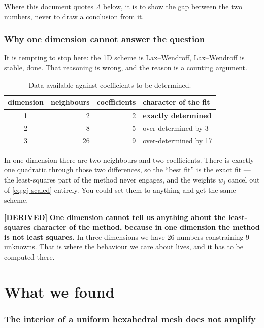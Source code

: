 \documentclass[11pt,a4paper]{article}
\newcommand{\derived}{\textcolor{blue!50!black}{\textbf{[DERIVED]}}}
\begin{document}
Where this document quotes $\Lambda$ below, it is to show the gap between the two numbers, never
to draw a conclusion from it.

\section{Why one dimension cannot answer the question}

It is tempting to stop here: the 1D scheme is Lax--Wendroff, Lax--Wendroff is stable, done.
That reasoning is wrong, and the reason is a counting argument.

\begin{table}[h]
\centering
\caption{Data available against coefficients to be determined.}
\label{tab:ladder}
\begin{tabular}{crrl}
\toprule
dimension & neighbours & coefficients & character of the fit \\
\midrule
1 & 2  & 2 & \textbf{exactly determined} \\
2 & 8  & 5 & over-determined by 3 \\
3 & 26 & 9 & over-determined by 17 \\
\bottomrule
\end{tabular}
\end{table}

In one dimension there are two neighbours and two coefficients. There is exactly one
quadratic through those two differences, so the ``best fit'' is the exact fit --- the
least-squares part of the method never engages, and the weights $w_j$ cancel out of
\eqref{eq:gj-scaled} entirely. You could set them to anything and get the same scheme.

\derived{} \textbf{One dimension cannot tell us anything about the least-squares character of
the method, because in one dimension the method is not least squares.} In three dimensions we
have 26 numbers constraining 9 unknowns. That is where the behaviour we care about lives, and
it has to be computed there.

\part{What we found}

\section{The interior of a uniform hexahedral mesh does not amplify}
\label{sec:interior}
\end{document}
